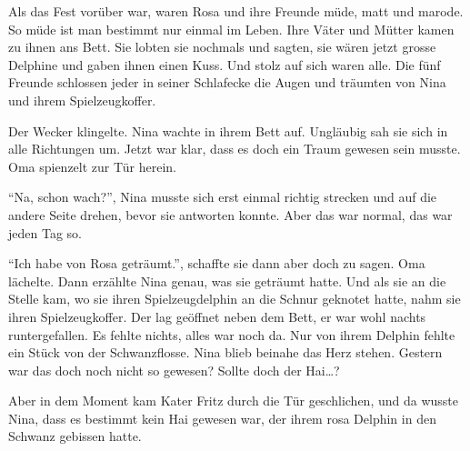 Als das Fest vorüber war, waren Rosa und ihre Freunde müde, matt und marode. So müde ist man bestimmt nur einmal im Leben. Ihre Väter und Mütter kamen zu ihnen ans Bett. Sie lobten sie nochmals und sagten, sie wären jetzt grosse Delphine und gaben ihnen einen Kuss. Und stolz auf sich waren alle. Die fünf Freunde schlossen jeder in seiner Schlafecke die Augen und träumten von Nina und ihrem Spielzeugkoffer.

\vspace{10pt}
 \centerline{\Huge \Dolphin[red]}
\vspace{10pt}

Der Wecker klingelte. Nina wachte in ihrem Bett auf. Ungläubig sah sie sich in alle Richtungen um. Jetzt war klar, dass es doch ein Traum gewesen sein musste. Oma spienzelt zur Tür herein.

\enquote{Na, schon wach?}, Nina musste sich erst einmal richtig strecken und auf die andere Seite drehen, bevor sie antworten konnte. Aber das war normal, das war jeden Tag so.

\enquote{Ich habe von Rosa geträumt.}, schaffte sie dann aber doch zu sagen. Oma lächelte. Dann erzählte Nina genau, was sie geträumt hatte. Und als sie an die Stelle kam, wo sie ihren Spielzeugdelphin an die Schnur geknotet hatte, nahm sie ihren Spielzeugkoffer. Der lag geöffnet neben dem Bett, er war wohl nachts runtergefallen. Es fehlte nichts, alles war noch da. Nur von ihrem Delphin fehlte ein Stück von der Schwanzflosse. Nina blieb beinahe das Herz stehen. Gestern war das doch noch nicht so gewesen? Sollte doch der Hai\dots?

Aber in dem Moment kam Kater Fritz durch die Tür geschlichen, und da wusste Nina, dass es bestimmt kein Hai gewesen war, der ihrem rosa Delphin in den Schwanz gebissen hatte. 
\vspace{1cm}

\begin{center}
	\huge\color{red}\FourClowerOpen
\end{center}
